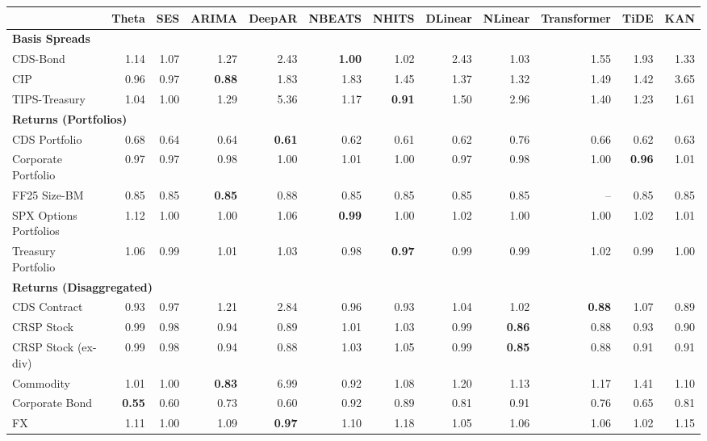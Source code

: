 \scriptsize
\setlength{\tabcolsep}{1.5pt}
\renewcommand{\arraystretch}{0.9}
\begin{tabular}{@{}lrrrrrrrrrrr@{}}
\toprule
 & Theta & SES & ARIMA & DeepAR & NBEATS & NHITS & DLinear & NLinear & Transformer & TiDE & KAN \\
\midrule
\multicolumn{12}{l}{\textbf{Basis Spreads}} \\
CDS-Bond & 1.14 & 1.07 & 1.27 & 2.43 & \textbf{1.00} & 1.02 & 2.43 & 1.03 & 1.55 & 1.93 & 1.33 \\
CIP & 0.96 & 0.97 & \textbf{0.88} & 1.83 & 1.83 & 1.45 & 1.37 & 1.32 & 1.49 & 1.42 & 3.65 \\
TIPS-Treasury & 1.04 & 1.00 & 1.29 & 5.36 & 1.17 & \textbf{0.91} & 1.50 & 2.96 & 1.40 & 1.23 & 1.61 \\
\midrule
\multicolumn{12}{l}{\textbf{Returns (Portfolios)}} \\
CDS Portfolio & 0.68 & 0.64 & 0.64 & \textbf{0.61} & 0.62 & 0.61 & 0.62 & 0.76 & 0.66 & 0.62 & 0.63 \\
Corporate Portfolio & 0.97 & 0.97 & 0.98 & 1.00 & 1.01 & 1.00 & 0.97 & 0.98 & 1.00 & \textbf{0.96} & 1.01 \\
FF25 Size-BM & 0.85 & 0.85 & \textbf{0.85} & 0.88 & 0.85 & 0.85 & 0.85 & 0.85 & -- & 0.85 & 0.85 \\
SPX Options Portfolios & 1.12 & 1.00 & 1.00 & 1.06 & \textbf{0.99} & 1.00 & 1.02 & 1.00 & 1.00 & 1.02 & 1.01 \\
Treasury Portfolio & 1.06 & 0.99 & 1.01 & 1.03 & 0.98 & \textbf{0.97} & 0.99 & 0.99 & 1.02 & 0.99 & 1.00 \\
\midrule
\multicolumn{12}{l}{\textbf{Returns (Disaggregated)}} \\
CDS Contract & 0.93 & 0.97 & 1.21 & 2.84 & 0.96 & 0.93 & 1.04 & 1.02 & \textbf{0.88} & 1.07 & 0.89 \\
CRSP Stock & 0.99 & 0.98 & 0.94 & 0.89 & 1.01 & 1.03 & 0.99 & \textbf{0.86} & 0.88 & 0.93 & 0.90 \\
CRSP Stock (ex-div) & 0.99 & 0.98 & 0.94 & 0.88 & 1.03 & 1.05 & 0.99 & \textbf{0.85} & 0.88 & 0.91 & 0.91 \\
Commodity & 1.01 & 1.00 & \textbf{0.83} & 6.99 & 0.92 & 1.08 & 1.20 & 1.13 & 1.17 & 1.41 & 1.10 \\
Corporate Bond & \textbf{0.55} & 0.60 & 0.73 & 0.60 & 0.92 & 0.89 & 0.81 & 0.91 & 0.76 & 0.65 & 0.81 \\
FX & 1.11 & 1.00 & 1.09 & \textbf{0.97} & 1.10 & 1.18 & 1.05 & 1.06 & 1.06 & 1.02 & 1.15 \\

\end{tabular}
